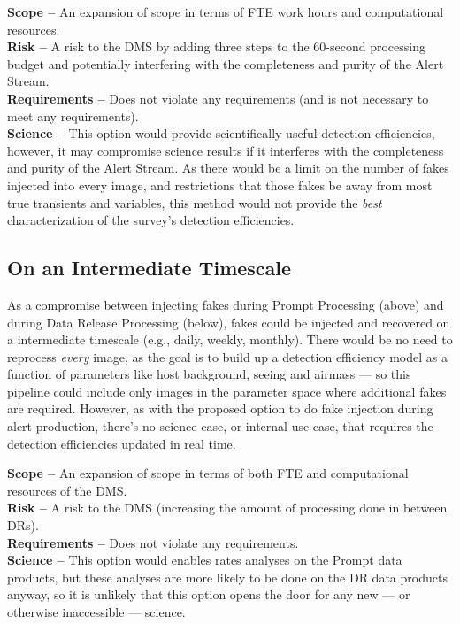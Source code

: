 \documentclass[DM,lsstdraft,toc]{lsstdoc}
\begin{document}
{\bf Scope --} An expansion of scope in terms of FTE work hours and computational resources. \\
{\bf Risk --} A risk to the DMS by adding three steps to the 60-second processing budget and potentially interfering with the completeness and purity of the Alert Stream. \\
{\bf Requirements --} Does not violate any requirements (and is not necessary to meet any requirements). \\
{\bf Science --} This option would provide scientifically useful detection efficiencies, however, it may compromise science results if it interferes with the completeness and purity of the Alert Stream. As there would be a limit on the number of fakes injected into every image, and restrictions that those fakes be away from most true transients and variables, this method would not provide the {\it best} characterization of the survey's detection efficiencies.


\subsection{On an Intermediate Timescale}\label{sssec:DE_fakes_ing}

As a compromise between injecting fakes during Prompt Processing (above) and during Data Release Processing (below), fakes could be injected and recovered on a intermediate timescale (e.g., daily, weekly, monthly). There would be no need to reprocess {\it every} image, as the goal is to build up a detection efficiency model as a function of parameters like host background, seeing and airmass --- so this pipeline could include only images in the parameter space where additional fakes are required. However, as with the proposed option to do fake injection during alert production, there's no science case, or internal use-case, that requires the detection efficiencies updated in real time.  

{\bf Scope --} An expansion of scope in terms of both FTE and computational resources of the DMS. \\
{\bf Risk --} A risk to the DMS (increasing the amount of processing done in between DRs). \\
{\bf Requirements --} Does not violate any requirements. \\
{\bf Science --} This option would enables rates analyses on the Prompt data products, but these analyses are more likely to be done on the DR data products anyway, so it is unlikely that this option opens the door for any new --- or otherwise inaccessible --- science. 
\end{document}
